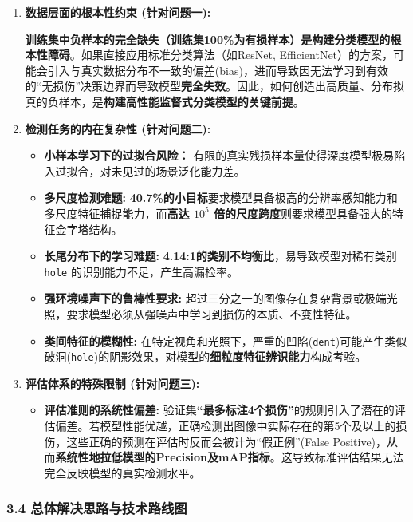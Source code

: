 \documentclass[
]{article}
\begin{document}
\begin{enumerate}
\def\labelenumi{\arabic{enumi}.}
\item
  \textbf{数据层面的根本性约束 (针对问题一):}

  \textbf{训练集中负样本的完全缺失（训练集100\%为有损样本）是构建分类模型的根本性障碍}。如果直接应用标准分类算法（如ResNet,
  EfficientNet）的方案，可能会引入与真实数据分布不一致的偏差(bias)，进而导致因无法学习到有效的``无损伤''决策边界而导致模型\textbf{完全失效}。因此，如何创造出高质量、分布拟真的负样本，是\textbf{构建高性能监督式分类模型的关键前提}。
\item
  \textbf{检测任务的内在复杂性 (针对问题二):}

  \begin{itemize}
  \item
    \textbf{小样本学习下的过拟合风险：}
    有限的真实残损样本量使得深度模型极易陷入过拟合，对未见过的场景泛化能力差。
  \item
    \textbf{多尺度检测难题:}
    \textbf{40.7\%的小目标}要求模型具备极高的分辨率感知能力和多尺度特征捕捉能力，而\textbf{高达
    \(10^5\) 倍的尺度跨度}则要求模型具备强大的特征金字塔结构。
  \item
    \textbf{长尾分布下的学习难题:}
    \textbf{4.14:1的类别不均衡比}，易导致模型对稀有类别 \texttt{hole}
    的识别能力不足，产生高漏检率。
  \item
    \textbf{强环境噪声下的鲁棒性要求:}
    超过三分之一的图像存在复杂背景或极端光照，要求模型必须从强噪声中学习到损伤的本质、不变性特征。
  \item
    \textbf{类间特征的模糊性:}
    在特定视角和光照下，严重的凹陷(\texttt{dent})可能产生类似破洞(\texttt{hole})的阴影效果，对模型的\textbf{细粒度特征辨识能力}构成考验。
  \end{itemize}
\item
  \textbf{评估体系的特殊限制 (针对问题三):}

  \begin{itemize}
  \item
    \textbf{评估准则的系统性偏差:}
    验证集\textbf{``最多标注4个损伤''}的规则引入了潜在的评估偏差。若模型性能优越，正确检测出图像中实际存在的第5个及以上的损伤，这些正确的预测在评估时反而会被计为``假正例''(False
    Positive)，从而\textbf{系统性地拉低模型的Precision及mAP指标}。这导致标准评估结果无法完全反映模型的真实检测水平。
  \end{itemize}
\end{enumerate}

\subsubsection{\texorpdfstring{\textbf{3.4
总体解决思路与技术路线图}}{3.4 总体解决思路与技术路线图}}\label{34-ux603bux4f53ux89e3ux51b3ux601dux8defux4e0eux6280ux672fux8defux7ebfux56fe}
\end{document}

